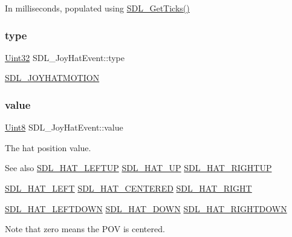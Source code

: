 In milliseconds, populated using \mbox{\hyperlink{_s_d_l__timer_8h_a0b9bc71d6287e0ffafdc3419760fe2b3}{S\+D\+L\+\_\+\+Get\+Ticks()}} \mbox{\label{struct_s_d_l___joy_hat_event_ac583dafab46c44354e210a542aff57cc}} 
\subsubsection{\texorpdfstring{type}{type}}
{\footnotesize\ttfamily \mbox{\hyperlink{_s_d_l__stdinc_8h_add440eff171ea5f55cb00c4a9ab8672d}{Uint32}} S\+D\+L\+\_\+\+Joy\+Hat\+Event\+::type}

\mbox{\hyperlink{_s_d_l__events_8h_a3b589e89be6b35c02e0dd34a55f3fccaafba4080bfbad335e520097b2024f0dff}{S\+D\+L\+\_\+\+J\+O\+Y\+H\+A\+T\+M\+O\+T\+I\+ON}} \mbox{\label{struct_s_d_l___joy_hat_event_a52b179a34407449941b61d988ca72ef4}} 
\subsubsection{\texorpdfstring{value}{value}}
{\footnotesize\ttfamily \mbox{\hyperlink{_s_d_l__stdinc_8h_a2944638813a090aa23e62f4da842c3e2}{Uint8}} S\+D\+L\+\_\+\+Joy\+Hat\+Event\+::value}

The hat position value. \begin{DoxySeeAlso}{See also}
\mbox{\hyperlink{_s_d_l__joystick_8h_a6d7988b43c09ced08ec318a2556f1858}{S\+D\+L\+\_\+\+H\+A\+T\+\_\+\+L\+E\+F\+T\+UP}} \mbox{\hyperlink{_s_d_l__joystick_8h_ac916fe96c0740790e5496e12c67d8889}{S\+D\+L\+\_\+\+H\+A\+T\+\_\+\+UP}} \mbox{\hyperlink{_s_d_l__joystick_8h_a65fde978b4ab9c269c215d1922ae7755}{S\+D\+L\+\_\+\+H\+A\+T\+\_\+\+R\+I\+G\+H\+T\+UP}} 

\mbox{\hyperlink{_s_d_l__joystick_8h_a4666c12cae25d8bab053d8569396cd77}{S\+D\+L\+\_\+\+H\+A\+T\+\_\+\+L\+E\+FT}} \mbox{\hyperlink{_s_d_l__joystick_8h_adbfd6f0bad25cd1bb79f8c0a065f3833}{S\+D\+L\+\_\+\+H\+A\+T\+\_\+\+C\+E\+N\+T\+E\+R\+ED}} \mbox{\hyperlink{_s_d_l__joystick_8h_a5d1844afaf2ceaf58c689a8bd480a543}{S\+D\+L\+\_\+\+H\+A\+T\+\_\+\+R\+I\+G\+HT}} 

\mbox{\hyperlink{_s_d_l__joystick_8h_a3fa8609d382a0f74507890491033c784}{S\+D\+L\+\_\+\+H\+A\+T\+\_\+\+L\+E\+F\+T\+D\+O\+WN}} \mbox{\hyperlink{_s_d_l__joystick_8h_aa87f7a91d6bae8b420b133559d983338}{S\+D\+L\+\_\+\+H\+A\+T\+\_\+\+D\+O\+WN}} \mbox{\hyperlink{_s_d_l__joystick_8h_abf50339da11ca12699ee2199607d275f}{S\+D\+L\+\_\+\+H\+A\+T\+\_\+\+R\+I\+G\+H\+T\+D\+O\+WN}}
\end{DoxySeeAlso}
Note that zero means the P\+OV is centered. \mbox{\label{struct_s_d_l___joy_hat_event_ac9d9bb179f9116d16b3da47cacd74b55}} 
